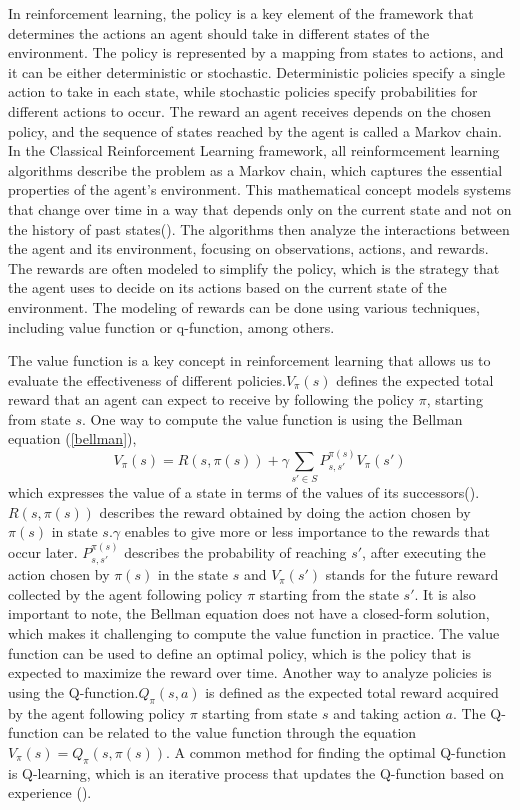 In reinforcement learning, the policy is a key element of the framework that determines the actions an agent should take in different states of the environment. The policy is represented by a mapping from states to actions, and it can be either deterministic or stochastic. Deterministic policies specify a single action to take in each state, while stochastic policies specify probabilities for different actions to occur. The reward an agent receives depends on the chosen policy, and the sequence of states reached by the agent is called a Markov chain. In the Classical Reinforcement Learning framework, all reinformcement learning algorithms describe the problem as a Markov chain, which captures the essential properties of the agent's environment. This mathematical concept models systems that change over time in a way that depends only on the current state and not on the history of past states(\cite{sutton_reinforcement_1998,sutton_reinforcement_2018}). The algorithms then analyze the interactions between the agent and its environment, focusing on observations, actions, and rewards. The rewards are often modeled to simplify the policy, which is the strategy that the agent uses to decide on its actions based on the current state of the environment. The modeling of rewards can be done using various techniques, including value function or q-function, among others.


The value function is a key concept in reinforcement learning that allows us to evaluate the effectiveness of different policies.$V_{\pi}(s)$ defines the expected total reward that an agent can expect to receive by following the policy $\pi$, starting from state $s$. One way to compute the value function is using the Bellman equation (\ref{bellman}),
\begin{equation}\label{bellman}
V_{\pi}(s) = R(s, \pi(s)) + \gamma \sum_{s' \in S} P_{s, s'}^{\pi(s)} V_{\pi}(s')
\end{equation}
which expresses the value of a state in terms of the values of its successors(\cite{barron_bellman_1989}). $R(s, \pi(s))$ describes the reward obtained by doing the action chosen by $\pi(s)$ in state $s$.$\gamma$ enables to give more or less importance to the rewards that occur later. $ P_{s, s'}^{\pi(s)}$ describes the probability of reaching $s'$, after executing the action chosen by $\pi(s)$ in the state $s$ and $V_{\pi}(s')$ stands for the future reward collected by the agent following policy $\pi$ starting from the state $s'$. It is also important to note, the Bellman equation does not have a closed-form solution, which makes it challenging to compute the value function in practice.
The value function can be used to define an optimal policy, which is the policy that is expected to maximize the reward over time. Another way to analyze policies is using the Q-function.$Q_{\pi}(s, a)$ is defined as the expected total reward acquired by the agent following policy $\pi$ starting from state $s$ and taking action $a$. The Q-function can be related to the value function through the equation $V_{\pi}(s) = Q_{\pi}(s, \pi(s))$. A common method for finding the optimal Q-function is Q-learning, which is an iterative process that updates the Q-function based on experience (\cite{watkins_q-learning_1992}). 


